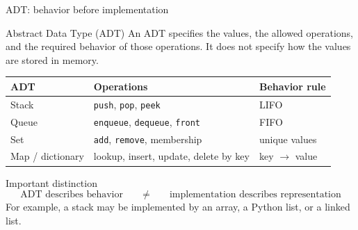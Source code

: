 \documentclass[aspectratio=169]{beamer}
\begin{document}
\begin{frame}{ADT: behavior before implementation}
\small
\begin{block}{Abstract Data Type (ADT)}
An ADT specifies the values, the allowed operations, and the required behavior of those operations. It does not specify how the values are stored in memory.
\end{block}
\begin{center}
\renewcommand{\arraystretch}{1.2}
\begin{tabular}{L{0.20\textwidth}L{0.36\textwidth}L{0.28\textwidth}}
\toprule
\textbf{ADT} & \textbf{Operations} & \textbf{Behavior rule} \\
\midrule
Stack & \texttt{push}, \texttt{pop}, \texttt{peek} & LIFO \\
Queue & \texttt{enqueue}, \texttt{dequeue}, \texttt{front} & FIFO \\
Set & \texttt{add}, \texttt{remove}, membership & unique values \\
Map / dictionary & lookup, insert, update, delete by key & key $\to$ value \\
\bottomrule
\end{tabular}
\end{center}
\begin{alertblock}{Important distinction}
\[
\boxed{\text{ADT describes behavior}} \qquad \neq \qquad \boxed{\text{implementation describes representation}}
\]
For example, a stack may be implemented by an array, a Python list, or a linked list.
\end{alertblock}
\end{frame}
\end{document}
